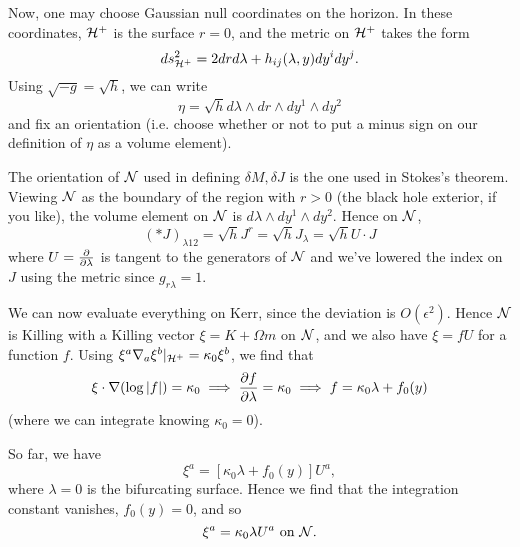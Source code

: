 Now, one may choose Gaussian null coordinates on the horizon. In these coordinates, $\cH^+$ is the surface $r=0$, and the metric on $\cH^+$ takes the form
\begin{equation}
     ds^2_{\cH^+}= 2drd\lambda +h_{ij}(\lambda,y) dy^i dy^j.
\end{equation}
Using $\sqrt{-g}=\sqrt{h}$, we can write
\begin{equation}
    \eta=\sqrt{h} d\lambda \wedge dr \wedge dy^1 \wedge dy^2
\end{equation}
and fix an orientation (i.e. choose whether or not to put a minus sign on our definition of $\eta$ as a volume element).

The orientation of $\cN$ used in defining $\delta M, \delta J$ is the one used in Stokes's theorem. Viewing $\cN$ as the boundary of the region with $r>0$ (the black hole exterior, if you like), the volume element on $\cN$ is $d\lambda \wedge dy^1 \wedge dy^2$. Hence on $\cN$,
\begin{equation}
    (*J)_{\lambda 12} = \sqrt{h} J^r = \sqrt{h} J_\lambda = \sqrt{h} U\cdot J
\end{equation}
where $U=\P{}{\lambda}$ is tangent to the generators of $\cN$ and we've lowered the index on $J$ using the metric since $g_{r\lambda}=1$.

We can now evaluate everything on Kerr, since the deviation is $O(\epsilon^2)$. Hence $\cN$ is Killing with a Killing vector $\xi=K+\Omega m$ on $\cN$, and we also have $\xi=f U$ for a function $f$. Using $\xi^a \nabla_a \xi^b|_{\cH^+}=\kappa_0 \xi^b$, we find that
\begin{equation}
    \xi \cdot \nabla( \log|f|)=\kappa_0 \implies \P{f}{\lambda}=\kappa_0 \implies f= \kappa_0 \lambda + f_0(y)
\end{equation}
(where we can integrate knowing $\kappa_0=0$).

So far, we have
\begin{equation}
     \xi^a = [\kappa_0 \lambda +f_0(y)]U^a,
\end{equation}
where $\lambda=0$ is the bifurcating surface. Hence we find that the integration constant vanishes, $f_0(y)=0$, and so
\begin{equation}
    \xi^a = \kappa_0 \lambda U^a\text{ on } \cN.
\end{equation}

